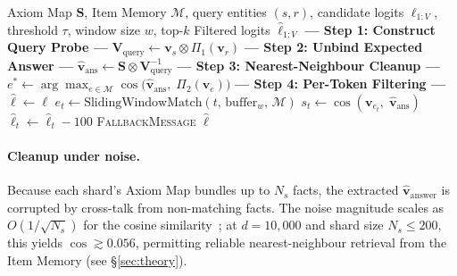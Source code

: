 \documentclass[11pt,a4paper]{article}
\begin{document}
\begin{algorithm}[t]
\caption{Safety Governor Token Filter}
\label{alg:governor}
\begin{algorithmic}[1]
\Require Axiom Map $\mathbf{S}$, Item Memory $\mathcal{M}$,
         query entities $(s, r)$, candidate logits $\ell_{1:V}$,
         threshold $\tau$, window size $w$, top-$k$
\Ensure Filtered logits $\hat{\ell}_{1:V}$
\Statex \textbf{--- Step 1: Construct Query Probe ---}
\State $\mathbf{V}_{\text{query}} \gets \mathbf{v}_s \otimes
       \Pi_1(\mathbf{v}_r)$ 
\Statex \textbf{--- Step 2: Unbind Expected Answer ---}
\State $\hat{\mathbf{v}}_{\text{ans}} \gets \mathbf{S} \otimes
       \mathbf{V}_{\text{query}}^{-1}$
\Statex \textbf{--- Step 3: Nearest-Neighbour Cleanup ---}
\State $e^* \gets \arg\max_{e \in \mathcal{M}}
       \cos\bigl(\hat{\mathbf{v}}_{\text{ans}},\;
       \Pi_2(\mathbf{v}_e)\bigr)$
\Statex \textbf{--- Step 4: Per-Token Filtering ---}
\State $\hat{\ell} \gets \ell$ 
    \State $e_t \gets \text{SlidingWindowMatch}(t,\, \text{buffer}_{w},\,
           \mathcal{M})$ 
     
        \State $s_t \gets \cos(\mathbf{v}_{e_t},\;
               \hat{\mathbf{v}}_{\text{ans}})$
            \State $\hat{\ell}_t \gets \hat{\ell}_t - 100$
        \EndIf
    \EndIf
\EndFor
{}
    \State \Return \textsc{FallbackMessage}
\EndIf
\State \Return $\hat{\ell}$
\end{algorithmic}
\end{algorithm}

\paragraph{Cleanup under noise.}
Because each shard's Axiom Map bundles up to $N_s$ facts, the
extracted $\hat{\mathbf{v}}_{\text{answer}}$ is corrupted by
cross-talk from non-matching facts.  The noise magnitude scales as
$O(1/\sqrt{N_s})$ for the cosine similarity~\citep{plate1995holographic};
at $d = 10{,}000$ and shard size $N_s \leq 200$, this yields
$\cos \gtrsim 0.056$, permitting reliable nearest-neighbour retrieval
from the Item Memory (see \S\ref{sec:theory}).
\end{document}
